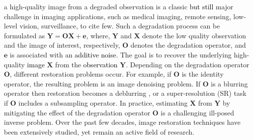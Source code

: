 \documentclass[10pt,journal,compsoc]{IEEEtran}
\newcommand{\sd}{\textcolor{black}}
\newcommand{\dk}{\textcolor{black}}
\def\bsX{{\boldsymbol{X}}}
\def\bsY{{\boldsymbol{Y}}}
\def\bse{{\boldsymbol{e}}}
\def\bsO{{\boldsymbol{O}}}
\begin{document}
 a high-quality image from a degraded observation is a classic \sd{but still} major challenge in imaging applications, such as medical imaging, remote sensing, low-level vision, surveillance, to cite few. Such a degradation process can be formulated as
$\bsY = \bsO \bsX + \bse$,
where, $\bsY$ and $\bsX$ denote the low quality observation and the image of interest, respectively, $\bsO$ denotes the degradation operator, and $\bse$ is associated with an \dk{additive  noise}. The goal is to recover the underlying high-quality \dk{image} $\bsX$ from the \dk{observation} $\bsY$. Depending on the degradation operator $\bsO$, different restoration problems occur. For example, if $\bsO$ is the identity operator, the resulting problem is an image denoising \cite{donoho1994ideal, Elad2006image, Dabov2007Image, Dong2013nonlocal} problem. If $\bsO$ is a blurring operator then restoration becomes a deblurring \cite{Danielyan2012bm3d, afonso2010fast, chan2013constrained, almeida2013deconvolving, Chen2016Compressive},
or a super-resolution (SR) task \cite{Gao2012image, Mudunuri2016low, Zhao2016fast} if $\bsO$ includes a subsampling operator. In practice, estimating $\bsX$ from $\bsY$ by mitigating the effect of the degradation operator $\bsO$ is a challenging ill-posed inverse problem. Over the past few decades, image restoration techniques have been extensively studied, yet remain an active field of research.
\end{document}
